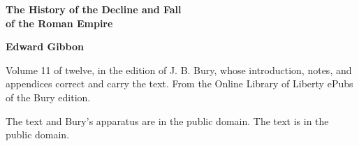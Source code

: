 \documentclass[11pt,letterpaper]{article}
\begin{document}
\color{ink}

\begin{titlepage}
\centering
\vspace*{4em}
{\LARGE\bfseries\color{heading} The History of the Decline and Fall\\[0.3em]of the Roman Empire\par}
\vspace{2em}
{\Large\bfseries\color{heading} Edward Gibbon\par}
\vspace{2.5em}
{\itshape\color{subhead}\parbox{0.8\linewidth}{\centering Volume 11 of twelve, in the edition of J. B. Bury, whose introduction, notes, and appendices correct and carry the text. From the Online Library of Liberty ePubs of the Bury edition.\par}}
\vfill
{\small The text and Bury's apparatus are in the public domain. The text is in the public domain.\par}
\vspace{2em}
\end{titlepage}

\tableofcontents


\end{document}
